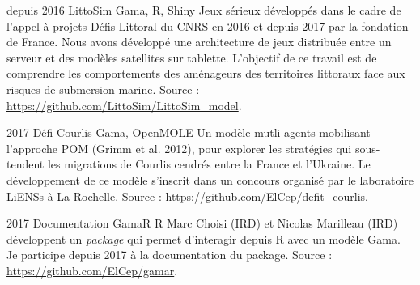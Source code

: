 \documentclass[]{cv-etienne}
\begin{document}
\begin{entrylist}
\entry
{depuis 2016}
{LittoSim}
{Gama, R, Shiny}
{
Jeux sérieux développés dans le cadre de l'appel à projets Défis Littoral du CNRS en 2016 et depuis 2017 par la fondation de France. Nous avons développé une architecture de jeux distribuée entre un serveur et des modèles satellites sur tablette. L'objectif de ce travail est de comprendre les comportements des aménageurs des territoires littoraux face aux risques de submersion marine. Source : \url{https://github.com/LittoSim/LittoSim_model}.
}
\end{entrylist}
\begin{entrylist}
\entry
{2017}
{Défi Courlis}
{Gama, OpenMOLE}
{
Un modèle mutli-agents mobilisant l'approche POM (Grimm et al. 2012), pour explorer les stratégies qui sous-tendent les migrations de Courlis cendrés entre la France et l'Ukraine. Le développement de ce modèle s'inscrit dans un concours organisé par le laboratoire LiENSs à La Rochelle. Source : \url{https://github.com/ElCep/defit_courlis}.
}
\end{entrylist}
\begin{entrylist}
\entry
{2017}
{Documentation GamaR}
{R}
{
Marc Choisi (IRD) et Nicolas Marilleau (IRD) développent un \textit{package} qui permet d'interagir depuis R avec un modèle Gama. Je participe depuis 2017 à la documentation du package. Source : \url{https://github.com/ElCep/gamar}.
}
\end{entrylist}
\end{document}

